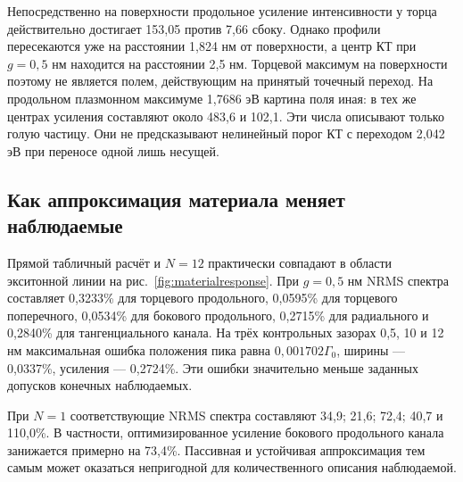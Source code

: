
Непосредственно на поверхности продольное усиление интенсивности
у торца действительно достигает 153,05 против 7,66 сбоку.
Однако профили пересекаются уже на расстоянии 1,824 нм от поверхности,
а центр КТ при $g=0{,}5$ нм находится на расстоянии 2,5 нм.
Торцевой максимум на поверхности поэтому не является полем,
действующим на принятый точечный переход.
На продольном плазмонном максимуме 1,7686 эВ картина поля иная:
в тех же центрах усиления составляют около 483,6 и 102,1.
Эти числа описывают только голую частицу. Они не предсказывают
нелинейный порог КТ с переходом 2,042 эВ при переносе одной лишь несущей.

\subsection{Как аппроксимация материала меняет наблюдаемые}
Прямой табличный расчёт и $N=12$ практически совпадают в области
экситонной линии на рис.~\ref{fig:materialresponse}.
При $g=0{,}5$ нм NRMS спектра составляет 0,3233\% для
торцевого продольного, 0,0595\% для торцевого поперечного,
0,0534\% для бокового продольного, 0,2715\% для радиального
и 0,2840\% для тангенциального канала. На трёх контрольных
зазорах 0,5, 10 и 12 нм максимальная ошибка положения пика равна
$0{,}001702\Gamma_0$, ширины --- 0,0337\%, усиления --- 0,2724\%.
Эти ошибки значительно меньше заданных допусков конечных наблюдаемых.


При $N=1$ соответствующие NRMS спектра составляют
34,9; 21,6; 72,4; 40,7 и 110,0\%. В частности,
оптимизированное усиление бокового продольного канала занижается
примерно на 73,4\%. Пассивная и устойчивая аппроксимация тем самым
может оказаться непригодной для количественного описания наблюдаемой.

